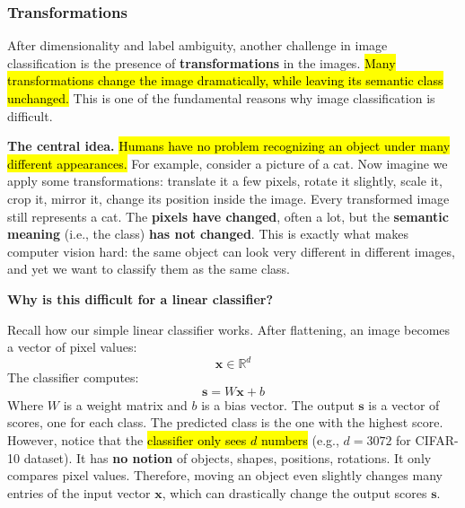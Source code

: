 \subsubsection{Transformations}\label{sec:transformations}

After dimensionality and label ambiguity, another challenge in image classification is the presence of \textbf{transformations} in the images. \hl{Many transformations change the image dramatically, while leaving its semantic class unchanged.} This is one of the fundamental reasons why image classification is difficult.

\highspace
\textcolor{Green3}{ \textbf{The central idea.}} \hl{Humans have no problem recognizing an object under many different appearances.} For example, consider a picture of a cat. Now imagine we apply some transformations: translate it a few pixels, rotate it slightly, scale it, crop it, mirror it, change its position inside the image. Every transformed image still represents a cat. The \textbf{pixels have changed}, often a lot, but the \textbf{semantic meaning} (i.e., the class) \textbf{has not changed}. This is exactly what makes computer vision hard: the same object can look very different in different images, and yet we want to classify them as the same class.

\highspace
\begin{flushleft}
    \textcolor{Green3}{ \textbf{Why is this difficult for a linear classifier?}}
\end{flushleft}
Recall how our simple linear classifier works. After flattening, an image becomes a vector of pixel values:
\begin{equation*}
    \mathbf{x} \in \mathbb{R}^{d}
\end{equation*}
The classifier computes:
\begin{equation*}
    \mathbf{s} = W \mathbf{x} + b
\end{equation*}
Where $W$ is a weight matrix and $b$ is a bias vector. The output $\mathbf{s}$ is a vector of scores, one for each class. The predicted class is the one with the highest score. However, notice that the \hl{classifier only sees $d$ numbers} (e.g., $d=3072$ for CIFAR-10 dataset). It has \textbf{no notion} of objects, shapes, positions, rotations. It only compares pixel values. Therefore, moving an object even slightly changes many entries of the input vector $\mathbf{x}$, which can drastically change the output scores $\mathbf{s}$.

